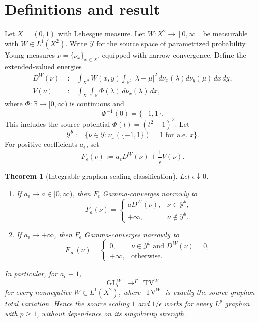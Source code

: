 \documentclass[11pt]{article}
\newtheorem{theorem}{Theorem}
\newcommand{\Y}{\mathcal{Y}}
\newcommand{\TV}{\operatorname{TV}}
\newcommand{\GL}{\operatorname{GL}}
\begin{document}
\section{Definitions and result}

Let \(X=(0,1)\) with Lebesgue measure. Let \(W:X^2\to[0,\infty]\) be measurable with \(W\in L^1(X^2)\). Write \(\Y\) for the source space of parametrized probability Young measures \(\nu=\{\nu_x\}_{x\in X}\), equipped with narrow convergence. Define the extended-valued energies
\begin{align*}
D^W(\nu)
&:=\int_{X^2}W(x,y)\int_{\mathbb R^2}|\lambda-\mu|^2
\,d\nu_x(\lambda)d\nu_y(\mu)\,dx\,dy,\\
V(\nu)
&:=\int_X\int_{\mathbb R}\Phi(\lambda)\,d\nu_x(\lambda)\,dx,
\end{align*}
where \(\Phi:\mathbb R\to[0,\infty)\) is continuous and
\[
\Phi^{-1}(0)=\{-1,1\}.
\]
This includes the source potential \(\Phi(t)=(t^2-1)^2\). Let
\[
\Y^b:=\{\nu\in\Y:\nu_x(\{-1,1\})=1\text{ for a.e. }x\}.
\]
For positive coefficients \(a_\epsilon\), set
\[
F_\epsilon(\nu):=a_\epsilon D^W(\nu)+\frac1\epsilon V(\nu).
\]

\begin{theorem}[Integrable-graphon scaling classification]\label{thm:main}
Let \(\epsilon\downarrow0\).
\begin{enumerate}[label=\textup{(\roman*)}]
\item If \(a_\epsilon\to a\in[0,\infty)\), then \(F_\epsilon\) Gamma-converges narrowly to
\[
F_a(\nu)=
\begin{cases}
aD^W(\nu),&\nu\in\Y^b,\\
+\infty,&\nu\notin\Y^b.
\end{cases}
\]
\item If \(a_\epsilon\to+\infty\), then \(F_\epsilon\) Gamma-converges narrowly to
\[
F_\infty(\nu)=
\begin{cases}
0,&\nu\in\Y^b\text{ and }D^W(\nu)=0,\\
+\infty,&\text{otherwise}.
\end{cases}
\]
\end{enumerate}
In particular, for \(a_\epsilon\equiv1\),
\[
\GL^W_\epsilon\ \mathop{\longrightarrow}^{\Gamma}\ \TV^W
\]
for every nonnegative \(W\in L^1(X^2)\), where \(\TV^W\) is exactly the source graphon total variation. Hence the source scaling \(1\) and \(1/\epsilon\) works for every \(L^p\) graphon with \(p\geq1\), without dependence on its singularity strength.
\end{theorem}
\end{document}

